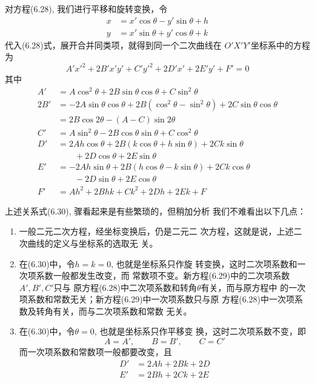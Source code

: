 对方程(6.28), 我们进行平移和旋转变换，令
\[\begin{split}
    x&=x'\cos\theta-y'\sin\theta+h\\
y&=x'\sin\theta+y'\cos\theta+k
\end{split}\]
代入(6.28)式，展开合并同类项，就得到同一个二次曲线在
$O'X'Y'$坐标系中的方程为
\begin{equation}
    A'{x'}^2+2B'x'y'+C'{y'}^2+2D'x'+2E'y'+F'=0
\end{equation}
其中
\begin{equation}
\begin{split}
    A'&=A\cos^2\theta +2B\sin\theta \cos\theta +C\sin^2\theta \\
2B'&=-2A\sin\theta \cos\theta +2B(\cos^2\theta -\sin^2\theta)+2C\sin\theta \cos\theta\\
 &=2B\cos2\theta-(A-C)\sin2\theta \\
C'&=A\sin^2\theta -2B\cos\theta \sin\theta +C\cos^2\theta \\
D'&=2Ah\cos\theta +2B(k\cos\theta +h\sin\theta )+2Ck\sin\theta\\
&\qquad +2D\cos\theta +2E\sin\theta \\
E'&=-2Ah\sin\theta +2B(h\cos\theta -k\sin\theta)+2Ck\cos\theta\\
&\qquad  -2D\sin\theta +2E\cos\theta \\
F'&=Ah^2+2Bhk+Ck^2+2Dh+2Ek+F
\end{split}
\end{equation}

上述关系式(6.30), 骤看起来是有些繁琐的，但稍加分析
我们不难看出以下几点：
\begin{enumerate}
\item 一般二元二次方程，经坐标变换后，仍是二元二
次方程，这就是说，上述二次曲线的定义与坐标系的选取无
关。
\item 在(6.30)中，令$h=k=0$, 也就是坐标系只作旋
转变换，这时二次项系数和一次项系数一般都发生改变，而
常数项不变。新方程(6.29)中的二次项系数$A',B',C'$只与
原方程(6.28)中二次项系数和转角$\theta$有关，而与原方程中
的一次项系数和常数无关；新方程(6.29)中一次项系数只与原
方程(6.28)中一次项系数及转角有关，而与二次项系数和常数
无关。
\item 在(6.30)中，令$\theta=0$, 也就是坐标系只作平移变
换，这时二次项系数不变，即
\[A=A',\qquad B=B',\qquad C=C'\]
而一次项系数和常数项一般都要改变，且
\begin{equation}
    \begin{split}
D'&=2Ah+2Bk+2D\\
E'&=2Bh+2Ck+2E        
    \end{split}
\end{equation}
\end{enumerate}

